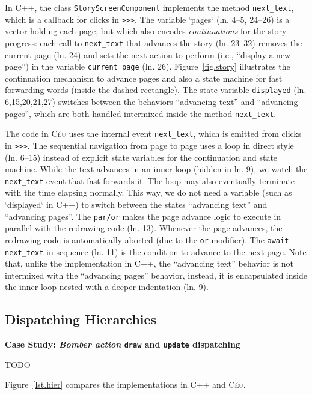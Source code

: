 \documentclass{vgtc}                          %
\newcommand{\CEU}{\textsc{C\'{e}u}\xspace}
\newcommand{\code}[1] {{\small{\texttt{#1}}}}
\begin{document}
In C++, the class \code{StoryScreenComponent} implements the method
\code{next\_text}, which is a callback for clicks in \code{>>>}.
%
The variable `pages` (ln. 4--5, 24--26) is a vector holding each page, but
which also encodes \emph{continuations} for the story progress:
each call to \code{next\_text} that advances the story (ln. 23--32) removes the 
current page (ln. 24) and sets the next action to perform (i.e., ``display a
new page'') in the variable \code{current\_page} (ln. 26).
Figure~\ref{fig.story} illustrates the continuation mechanism to advance 
pages and also a state machine for fast forwarding words (inside the dashed
rectangle).
The state variable \code{displayed} (ln. 6,15,20,21,27) switches between the
behaviors ``advancing text'' and ``advancing pages'', which are both handled
intermixed inside the method \code{next\_text}.

The code in \CEU uses the internal event \code{next\_text}, which is emitted
from clicks in \code{>>>}.
%
The sequential navigation from page to page uses a loop in direct style
(ln. 6--15) instead of explicit state variables for the continuation and state
machine.
While the text advances in an inner loop (hidden in ln. 9), we watch the
\code{next\_text} event that fast forwards it.
The loop may also eventually terminate with the time elapsing normally.
This way, we do not need a variable (such as `displayed` in C++) to switch 
between the states ``advancing text'' and ``advancing pages''.
The \code{par/or} makes the page advance logic to execute in parallel with the
redrawing code (ln. 13).
Whenever the page advances, the redrawing code is automatically aborted
(due to the \code{or} modifier).
The \code{await next\_text} in sequence (ln. 11) is the condition to advance to
the next page.
%
Note that, unlike the implementation in C++, the ``advancing text'' behavior is
not intermixed with the ``advancing pages'' behavior, instead, it is
encapsulated inside the inner loop nested with a deeper indentation (ln. 9).

\subsection{Dispatching Hierarchies}

\textbf{Case Study: \emph{Bomber action} \code{draw} and \code{update} dispatching}

TODO

Figure~\ref{lst.hier} compares the implementations in C++ and \CEU.
\end{document}
